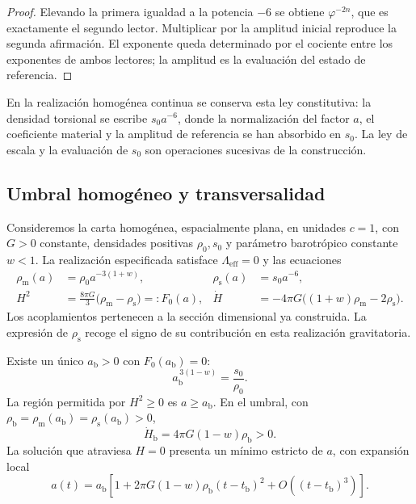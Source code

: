 \begin{proof}
Elevando la primera igualdad a la potencia \(-6\) se obtiene
\(\varphi^{-2n}\), que es exactamente el segundo lector. Multiplicar
por la amplitud inicial reproduce la segunda afirmación. El exponente
queda determinado por el cociente entre los exponentes de ambos
lectores; la amplitud es la evaluación del estado de referencia.
\end{proof}

En la realización homogénea continua se conserva esta ley constitutiva:
la densidad torsional se escribe \(s_0a^{-6}\), donde la normalización
del factor \(a\), el coeficiente material y la amplitud de referencia
se han absorbido en \(s_0\). La ley de escala y la evaluación de
\(s_0\) son operaciones sucesivas de la construcción.

\subsection{Umbral homogéneo y transversalidad}
\label{vii:sec:umbral-rebote}

Consideremos la carta homogénea, espacialmente plana, en unidades \(c=1\),
con \(G>0\) constante, densidades positivas \(\rho_0,s_0\) y parámetro
barotrópico constante \(w<1\). La realización especificada satisface
\(\Lambda_{\mathrm{eff}}=0\) y las ecuaciones
\begin{align}
 \rho_{\mathrm m}(a)&=\rho_0a^{-3(1+w)},&
 \rho_{\mathrm s}(a)&=s_0a^{-6},\\
 H^2&=\frac{8\pi G}{3}
        \bigl(\rho_{\mathrm m}-\rho_{\mathrm s}\bigr)
        =:F_0(a),&
 \dot H&=-4\pi G
        \bigl((1+w)\rho_{\mathrm m}-2\rho_{\mathrm s}\bigr).
 \label{vii:eq:dinamica-homogenea}
\end{align}
Los acoplamientos pertenecen a la sección dimensional ya construida.
La expresión de \(\rho_{\mathrm s}\) recoge el signo de su contribución
en esta realización gravitatoria.

\begin{theorem}
\label{vii:thm:rebote}
Existe un único \(a_{\mathrm b}>0\) con \(F_0(a_{\mathrm b})=0\):
\[
 a_{\mathrm b}^{\,3(1-w)}=\frac{s_0}{\rho_0}.
\]
La región permitida por \(H^2\geq0\) es \(a\geq a_{\mathrm b}\).
En el umbral, con
\(\rho_{\mathrm b}=\rho_{\mathrm m}(a_{\mathrm b})
                  =\rho_{\mathrm s}(a_{\mathrm b})>0\),
\[
 \dot H_{\mathrm b}=4\pi G(1-w)\rho_{\mathrm b}>0.
\]
La solución que atraviesa \(H=0\) presenta un mínimo estricto de \(a\),
con expansión local
\[
 a(t)=a_{\mathrm b}\left[
 1+2\pi G(1-w)\rho_{\mathrm b}(t-t_{\mathrm b})^2
 +O((t-t_{\mathrm b})^3)\right].
\]
\end{theorem}

